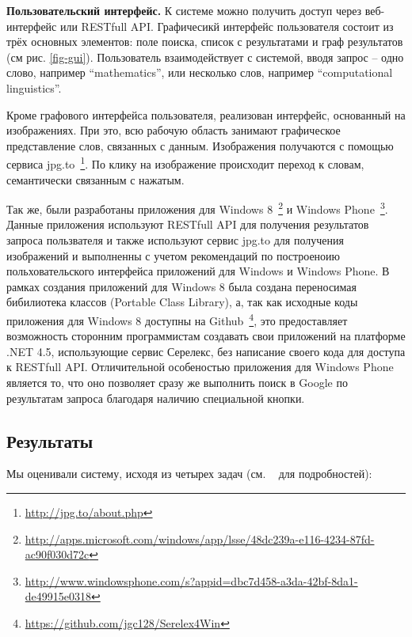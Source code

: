 \documentclass[a4paper,10pt,twoside]{article}
\begin{document}
\textbf{Пользовательский интерфейс.} К системе можно получить доступ через веб-интерфейс или RESTfull API. Графичесикй интерфейс пользователя состоит из трёх основных элементов: поле поиска, список с результатами и граф результатов (см рис. \ref{fig-gui}). Пользователь взаимодействует с системой, вводя запрос -- одно слово, например ``mathematics'', или несколько слов, например ``computational linguistics''. 


Кроме графового интерфейса пользователя, реализован интерфейс, основанный на изображениях. При это, всю рабочую область занимают графическое представление слов, связанных с данным. Изображения получаются с помощью сервиса jpg.to~\footnote{\url{http://jpg.to/about.php}}. По клику на изображение происходит переход к словам, семантически связанным с нажатым.


Так же, были разработаны приложения для Windows 8~\footnote{\url{http://apps.microsoft.com/windows/app/lsse/48dc239a-e116-4234-87fd-ac90f030d72c}} и Windows Phone~\footnote{\url{http://www.windowsphone.com/s?appid=dbc7d458-a3da-42bf-8da1-de49915e0318}}. Данные приложения используют RESTfull API для получения результатов запроса пользвателя и также используют сервис jpg.to для получения изображений и выполненны с учетом рекомендаций по построеноию польховательского интерфейса приложений для Windows и Windows Phone. В рамках создания приложений для Windows 8 была создана переносимая бибилиотека классов (Portable Class Library), а, так как исходные коды приложения для Windows 8 доступны на Github~\footnote{\url{https://github.com/jgc128/Serelex4Win}}, это предоставляет возможность сторонним программистам создавать свои приложений на платформе .NET 4.5, использующие сервис Серелекс, без написание своего кода для доступа к RESTfull API. Отличительной особеностью приложения для Windows Phone является то, что оно 
позволяет сразу же выполнить поиск в Google по результатам запроса благодаря наличию специальной кнопки.



\subsection{Результаты}
Мы оценивали систему, исходя из четырех задач (см. ~\cite{panchenko2012konvens} для подробностей):
\end{document}
